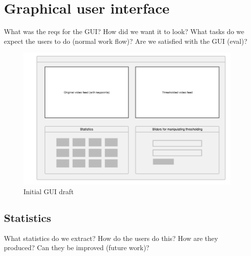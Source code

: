 
\section{Graphical user interface}

What was the reqs for the GUI?
How did we want it to look?
What tasks do we expect the users to do (normal work flow)?
Are we satisfied with the GUI (eval)?

\begin{figure}[!ht]
    \centering
    \includegraphics[scale = 0.3]{img/termes_gui.png}
    \caption{Initial GUI draft}
\end{figure}

\subsection{Statistics}
What statistics do we extract?
How do the users do this?
How are they produced?
Can they be improved (future work)?
